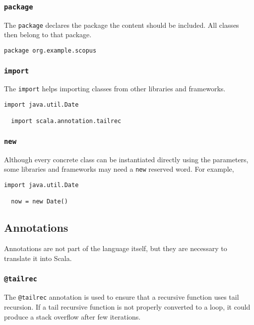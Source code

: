 \documentclass[12pt,a4paper]{article}
\makeatletter
\newcommand{\srccode}[1]{\texttt{{#1}}}
\newcommand{\reservedWord}[1]{{\color{blue}\srccode{#1}}\xspace}
\newcommand{\annotation}[1]{{\color{brown}\srccode{#1}}\xspace}
\newcommand{\spackage}{\reservedWord{package}}
\newcommand{\simport}{\reservedWord{import}}
\newcommand{\snew}{\reservedWord{new}}
\newcommand{\stailrec}{\annotation{@tailrec}}
\makeatother
\begin{document}
    \subsubsection{\spackage}

    The \spackage declares the package the content should be included.
    All classes then belong to that package.

    \begin{lstlisting}[label={lst:examplePackage}]
  package org.example.scopus
    \end{lstlisting}

    \subsubsection{\simport}

    The \simport helps importing classes from other libraries and frameworks.

    \begin{lstlisting}[label={lst:examplePackage}]
  import java.util.Date

  import scala.annotation.tailrec
    \end{lstlisting}

    \subsubsection{\snew}

    Although every concrete class can be instantiated directly using the parameters, some libraries and frameworks may need a \snew reserved word.
    For example,

    \begin{lstlisting}[label={lst:examplePackage}]
  import java.util.Date

  now = new Date()
    \end{lstlisting}

    \subsection{Annotations}

    Annotations are not part of the language itself, but they are necessary to translate it into Scala.

    \subsubsection{\stailrec}

    The \stailrec annotation is used to ensure that a recursive function uses tail recursion.
    If a tail recursive function is not properly converted to a loop, it could produce a stack overflow after few iterations.
\end{document}
